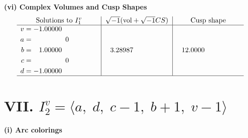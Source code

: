 \documentclass[1p]{elsarticle_modified}
\theoremstyle{definition}
\newcommand{\I}{\sqrt{-1}}
\begin{document}
\newpage\flushleft \textbf{(vi) Complex Volumes and Cusp Shapes}
$$\begin{array}{c|c|c}  
\text{Solutions to }I^v_{1}& \I (\text{vol} + \sqrt{-1}CS) & \text{Cusp shape}\\
 \hline 
\begin{aligned}
v &= -1.00000\phantom{ +0.000000I} \\
a &= \phantom{-0.000000 } 0 \\
b &= \phantom{-}1.00000\phantom{ +0.000000I} \\
c &= \phantom{-0.000000 } 0 \\
d &= -1.00000\phantom{ +0.000000I}\end{aligned}
 & \phantom{-}3.28987\phantom{ +0.000000I} & \phantom{-}12.0000\phantom{ +0.000000I}\\
 \hline 
 \end{array}$$\newpage\newpage\renewcommand{\arraystretch}{1}
\centering \section*{VII. $I^v_{2}= \langle a,\;d,\;c-1,\;b+1,\;v-1 \rangle$}
\flushleft \textbf{(i) Arc colorings}\\
\end{document}
